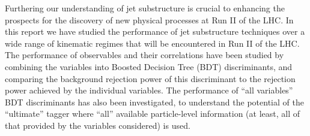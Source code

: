 
Furthering our understanding of jet substructure is crucial to 
enhancing the prospects for the discovery of new physical processes at Run II of the LHC. In this report we have studied the performance of jet substructure techniques over a wide range of kinematic regimes that will be encountered in Run II of the LHC. The performance of observables and their correlations have been studied by combining the variables into Boosted Decision Tree (BDT) discriminants, and comparing the background rejection power of this discriminant to the rejection power achieved by the individual variables. The performance of ``all variables'' BDT discriminants has also been investigated, to understand the potential of the ``ultimate'' tagger where ``all'' available particle-level information (at least, all of that provided by the variables considered) is used.

